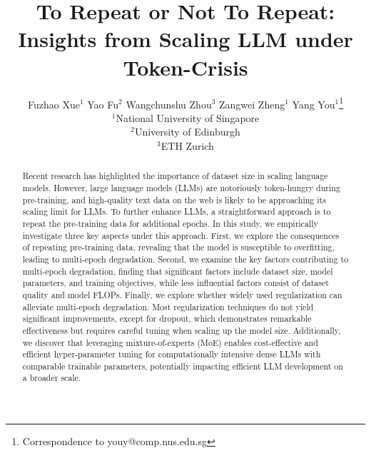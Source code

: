 \documentclass{article}
\title{To Repeat or Not To Repeat: \\ Insights from Scaling LLM under Token-Crisis}
\author{
Fuzhao Xue$^{1}$ \quad
Yao Fu$^2$ \quad
Wangchunshu Zhou$^3$ \quad
Zangwei Zheng$^{1}$ \quad
Yang You$^{1}$\thanks{Correspondence to youy@comp.nus.edu.sg} \\
$^1$National University of Singapore \\
$^2$University of Edinburgh \\
$^3$ETH Zurich \\
}
\newcommand{\eg}{\emph{e.g.,}\xspace}
\begin{document}
\maketitle


\begin{abstract}

Recent research has highlighted the importance of dataset size in scaling language models. 
However, large language models (LLMs) are notoriously token-hungry during pre-training, and high-quality text data on the web is likely to be approaching its scaling limit for LLMs.
To further enhance LLMs, a straightforward approach is to repeat the pre-training data for additional epochs. 
In this study, we empirically investigate three key aspects under this approach. First, we explore the consequences of repeating pre-training data, revealing that the model is susceptible to overfitting, leading to multi-epoch degradation. Second, we examine the key factors contributing to multi-epoch degradation, finding that significant factors include dataset size, model parameters, and training objectives, while less influential factors consist of dataset quality and model FLOPs. Finally, we explore whether widely used regularization can alleviate multi-epoch degradation. Most regularization techniques do not yield significant improvements, except for dropout, which demonstrates remarkable effectiveness but requires careful tuning when scaling up the model size. Additionally, we discover that leveraging mixture-of-experts (MoE) enables cost-effective and efficient hyper-parameter tuning for computationally intensive dense LLMs with comparable trainable parameters, potentially impacting efficient LLM development on a broader scale.





\end{abstract}
\end{document}
